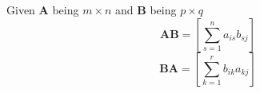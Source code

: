 \begin{frame}{\insertsubsection}

\begin{definition}
Given $\mathbf{A}$ being $m \times n$ and $\mathbf{B}$ being $p \times q$
\begin{equation*}
\mathbf{A}\mathbf{B} = \left[ \sum^n_{s=1} a_{is}b_{sj} \right]
\end{equation*}
\begin{equation*}
\mathbf{B}\mathbf{A} = \left[ \sum^r_{k=1} b_{ik}a_{kj} \right]
\end{equation*}
\end{definition}

\end{frame}
